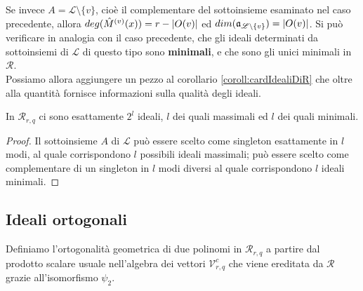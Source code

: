 Se invece $A = \mathscr{L} \setminus \lbrace v \rbrace$, cioè il complementare del sottoinsieme esaminato nel caso precedente, allora 
$deg(\hat{M}^{(v)}(x) ) = r - \arrowvert O(v) \arrowvert$ ed $dim(\mathfrak{a}_{\mathscr{L} \setminus \lbrace v \rbrace}) = \arrowvert O(v) \arrowvert$. Si può verificare in analogia con il caso precedente, che gli ideali determinati da sottoinsiemi di $\mathscr{L}$ di questo tipo sono {\bf minimali}, e che sono gli unici minimali in $\mathcal{R}$.\\
Possiamo allora aggiungere un pezzo al corollario \ref{coroll:cardIdealiDiR} che oltre alla quantità fornisce informazioni sulla qualità degli ideali.

\begin{corollario}\label{cor:cardIdealiDiR}
   In $\mathcal{R}_{r,q}$ ci sono esattamente $2^{l}$ ideali, $l$ dei quali massimali ed $l$ dei quali minimali.
\end{corollario}
\begin{proof}
   Il sottoinsieme $A$ di $\mathscr{L}$ può essere scelto come singleton esattamente in $l$ modi, al quale corrispondono $l$ possibili ideali massimali; può essere scelto come complementare di un singleton in $l$ modi diversi al quale corrispondono $l$ ideali minimali.
\end{proof}


\subsection{Ideali ortogonali}

Definiamo l'ortogonalità geometrica di due polinomi in $\mathcal{R}_{r,q}$ a partire dal prodotto scalare usuale nell'algebra dei vettori $\mathcal{V}_{r, q}^{c}$ che viene ereditata da $\mathcal{R}$ grazie all'isomorfismo $\psi_{2}$.


